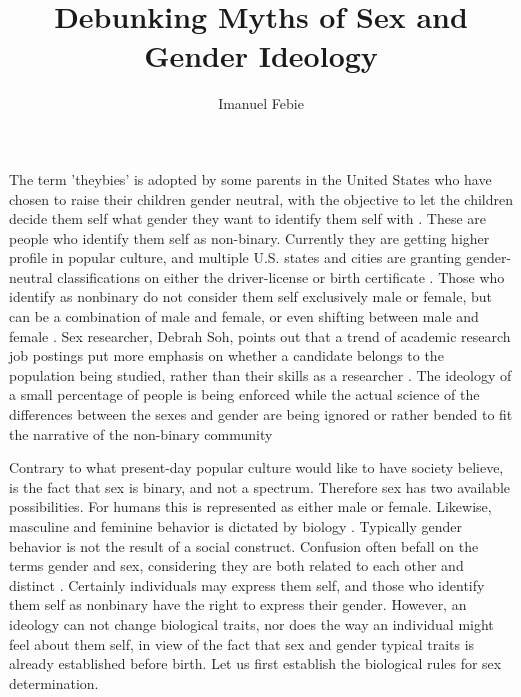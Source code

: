 \documentclass[12pt]{article}
\begin{document}
\title{Debunking Myths of Sex and Gender Ideology}
\author{Imanuel Febie}
\maketitle

The term 'theybies' is adopted by some parents in the United States who have chosen to raise their children gender neutral, with the objective to let the children decide them self what gender they want to identify them self with \cite{raisingTheybies}. These are people who identify them self as non-binary. Currently they are getting higher profile in popular culture, and multiple U.S. states and cities are granting gender-neutral classifications on either the driver-license or birth certificate \cite{nonbinaryGenderAwareness}. Those who identify as nonbinary do not consider them self exclusively male or female, but can be a combination of male and female, or even shifting between male and female \cite{nonBinaryGender2017}. Sex researcher, Debrah Soh, points out that a trend of academic research job postings put more emphasis on whether a candidate belongs to the population being studied, rather than their skills as a researcher \cite{endOfGender2020Soh}. The ideology of a small percentage of people is being enforced while the actual science of the differences between the sexes and gender are being ignored or rather bended to fit the narrative of the non-binary community

Contrary to what present-day popular culture would like to have society believe, is the fact that sex is binary, and not a spectrum. Therefore sex has two available possibilities. For humans this is represented as either male or female. Likewise, masculine and feminine behavior is dictated by biology \cite{personalityAndGenderDifferences}. Typically gender behavior is not the result of a social construct. Confusion often befall on the terms gender and sex, considering they are both related to each other and distinct \cite{psychosexualDifferentiation}. Certainly individuals may express them self, and those who identify them self as nonbinary have the right to express their gender. However, an ideology can not change biological traits, nor does the way an individual might feel about them self, in view of the fact that sex and gender typical traits is already established before birth. Let us first establish the biological rules for sex determination. 
\end{document}
